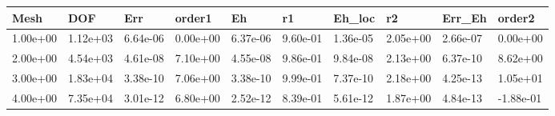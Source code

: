 \begin{tabular}{llllllllll}
Mesh & DOF & Err & order1 & Eh & r1 & Eh_loc & r2 & Err_Eh & order2 \\ 
\hline 
1.00e+00 & 1.12e+03 & 6.64e-06 & 0.00e+00 & 6.37e-06 & 9.60e-01 & 1.36e-05 & 2.05e+00 & 2.66e-07 &  0.00e+00 \\ 
2.00e+00 & 4.54e+03 & 4.61e-08 & 7.10e+00 & 4.55e-08 & 9.86e-01 & 9.84e-08 & 2.13e+00 & 6.37e-10 &  8.62e+00 \\ 
3.00e+00 & 1.83e+04 & 3.38e-10 & 7.06e+00 & 3.38e-10 & 9.99e-01 & 7.37e-10 & 2.18e+00 & 4.25e-13 &  1.05e+01 \\ 
4.00e+00 & 7.35e+04 & 3.01e-12 & 6.80e+00 & 2.52e-12 & 8.39e-01 & 5.61e-12 & 1.87e+00 & 4.84e-13 & -1.88e-01 \\ 
\hline 
\end{tabular}